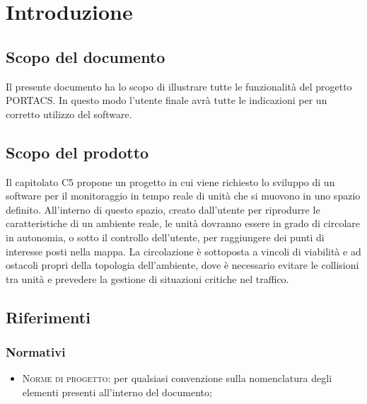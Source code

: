 \section{Introduzione}
\subsection{Scopo del documento}
    Il presente documento ha lo scopo di illustrare tutte le funzionalità del progetto PORTACS. In questo modo l'utente finale avrà tutte le indicazioni per un corretto utilizzo del software.


\subsection{Scopo del prodotto}

    Il capitolato C5 propone un progetto in cui viene richiesto lo sviluppo di un software per il monitoraggio in tempo reale di unità che si muovono in uno spazio definito. All'interno di questo spazio, creato dall'utente per riprodurre le caratteristiche di un ambiente reale, le unità dovranno essere in grado di circolare in autonomia, o sotto il controllo dell'utente, per raggiungere dei punti di interesse posti nella mappa. La circolazione è sottoposta a vincoli di viabilità e ad ostacoli propri della topologia dell'ambiente, dove è necessario evitare le collisioni tra unità e prevedere la gestione di situazioni critiche nel traffico.

\subsection{Riferimenti}
\label{ref}
    \subsubsection{Normativi}
    \begin{itemize}
    	\item \textsc{Norme di progetto}: per qualsiasi convenzione sulla nomenclatura degli elementi presenti all'interno del documento;
    	
    \end{itemize}

